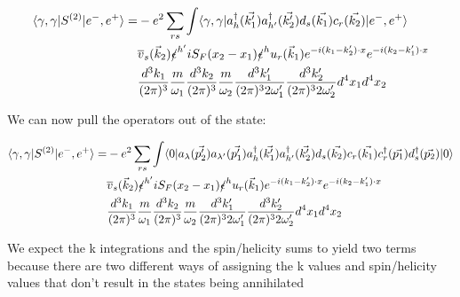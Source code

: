 \documentclass[a4]{article}
\begin{document}
\begin{framed}
            \begin{equation}
                \begin{aligned}
                    \langle \gamma, \gamma | S^{(2)} | e^{-}, e^{+} \rangle = & - e^{2} \sum_{r s} \int \langle \gamma, \gamma |a^{\dagger}_{h} (\vec{k'_1}) a^{\dagger}_{h'} (\vec{k'_2}) d_{s} (\vec{k_1}) c_{r} (\vec{k_2})| e^{-}, e^{+} \rangle \\
                    & \overline{v}_{s} (\vec{k}_2) \slashed{\epsilon}^{h'} i S_{F} (x_2 - x_1) \slashed{\epsilon}^{h} u_{r} (\vec{k}_1) e^{- i (k_1 - k'_2) \cdot x} e^{- i (k_2 - k'_1) \cdot x} \\
                    & \frac{d^3 k_1}{(2 \pi)^{3}} \frac{m}{\omega_1} \frac{d^3 k_2}{(2 \pi)^{3}} \frac{m}{\omega_2} \frac{d^3 k'_1}{(2 \pi)^{3} 2 \omega'_1} \frac{d^3 k'_2}{(2 \pi)^{3} 2 \omega'_2} d^4 x_1 d^4 x_2
                \end{aligned}
            \end{equation}

            We can now pull the operators out of the state: 

            \begin{equation}
                \begin{aligned}
                    \langle \gamma, \gamma | S^{(2)} | e^{-}, e^{+} \rangle = & - e^{2} \sum_{r s} \int \langle 0 |a_{\lambda} (\vec{p'_2}) a_{\lambda'} (\vec{p'_1}) a^{\dagger}_{h} (\vec{k'_1}) a^{\dagger}_{h'} (\vec{k'_2}) d_{s} (\vec{k_2}) c_{r} (\vec{k_1}) c^{\dagger}_{r} (\vec{p_1}) d^{\dagger}_{s} (\vec{p_2})| 0 \rangle \\
                    & \overline{v}_{s} (\vec{k}_2) \slashed{\epsilon}^{h'} i S_{F} (x_2 - x_1) \slashed{\epsilon}^{h} u_{r} (\vec{k}_1) e^{- i (k_1 - k'_2) \cdot x} e^{- i (k_2 - k'_1) \cdot x} \\
                    & \frac{d^3 k_1}{(2 \pi)^{3}} \frac{m}{\omega_1} \frac{d^3 k_2}{(2 \pi)^{3}} \frac{m}{\omega_2} \frac{d^3 k'_1}{(2 \pi)^{3} 2 \omega'_1} \frac{d^3 k'_2}{(2 \pi)^{3} 2 \omega'_2} d^4 x_1 d^4 x_2
                \end{aligned}
            \end{equation}

            \begin{framed}
                We expect the k integrations and the spin/helicity sums to yield two terms because there are two different ways of assigning the k
                values and spin/helicity values that don't result in the states being annihilated
            \end{framed}


\end{framed}
\end{document}
